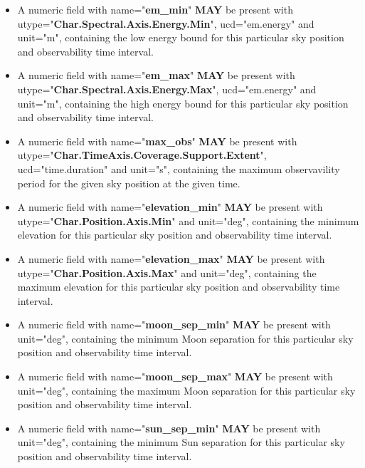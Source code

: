 \documentclass[11pt,a4paper]{ivoatex/ivoa}
\begin{document}
\begin{itemize}
\item {A numeric field with name="\textbf{em\_min}" \textbf{MAY } be present with\\
utype="\textbf{Char.Spectral.Axis.Energy.Min}",
ucd="em.energy" and unit="m", containing the low energy bound for 
this particular sky position and observability time interval.}

\item {A numeric field with name="\textbf{em\_max}" \textbf{MAY } be present with\\
utype="\textbf{Char.Spectral.Axis.Energy.Max}", 
ucd="em.energy" and unit="m", containing the high energy bound for this 
particular sky position and observability time interval.}

\item {A numeric field with name="\textbf{max\_obs}" \textbf{MAY } be present with
utype="\textbf{Char.TimeAxis.Coverage.Support.Extent}", \\
ucd="time.duration" and unit="s", containing the maximum observavility period for 
the given sky position at the given time.} 

\item {A numeric field with name="\textbf{elevation\_min}" \textbf{MAY } be present with
utype="\textbf{Char.Position.Axis.Min}" and unit="deg",
containing the minimum elevation for this particular sky position and observability time interval.}

\item {A numeric field with name="\textbf{elevation\_max}" \textbf{MAY } be present with
utype="\textbf{Char.Position.Axis.Max}" and unit="deg",
containing the maximum elevation for this particular sky position and observability time interval.}

\item {A numeric field with name="\textbf{moon\_sep\_min}" \textbf{MAY } be present with unit="deg", 
containing the minimum Moon separation for this particular sky position and observability time interval.}

\item {A numeric field with name="\textbf{moon\_sep\_max}" \textbf{MAY }be present with 
unit="deg", containing the maximum Moon separation for this particular sky position and observability time interval.}

\item {A numeric field with name="\textbf{sun\_sep\_min}" \textbf{MAY }be present with
unit="deg", containing the minimum Sun separation for this particular sky position and observability time interval.}


\end{itemize}
\end{document}
